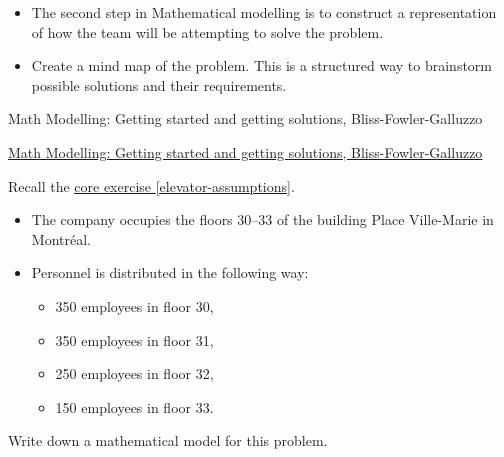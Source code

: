 \begin{lesson}

	\begin{itemize}
		\item The second step in Mathematical modelling is to construct a representation of how the team will be attempting to solve the problem.
		\item Create a mind map of the problem. This is a structured way to brainstorm possible solutions and their requirements.
	\end{itemize}
	

\begin{annotation}
	\begin{goals}
	Math Modelling: Getting started and getting solutions, Bliss-Fowler-Galluzzo
	
	\hfill {}	
	\end{goals}
\end{annotation}
	 \href{https://m3challenge.siam.org/resources/modeling-handbook}{Math Modelling: Getting started and getting solutions, Bliss-Fowler-Galluzzo}

\end{lesson}







\begin{minipage}{.5\textwidth}	
\question
Recall the \hyperref[elevator-assumptions]{core exercise \ref{elevator-assumptions}}.

\begin{itemize}
	\item The company occupies the floors 30--33 of the building Place Ville-Marie in Montr\'eal.

	\item Personnel is distributed in the following way: 
	\begin{itemize}
		\item 350 employees in floor 30,
		\item 350 employees in floor 31,
		\item 250 employees in floor 32, 
		\item 150 employees in floor 33.
	\end{itemize}
\end{itemize}

\vspace{2cm}

Write down a mathematical model for this problem.
\label{elevator-model}
\end{minipage}
\qquad
\begin{minipage}{.5\textwidth}	
\email
\end{minipage}

